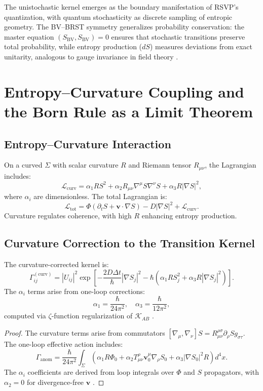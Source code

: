 \documentclass[12pt]{article}
\begin{document}
The unistochastic kernel emerges as the boundary manifestation of RSVP’s quantization, with quantum stochasticity as discrete sampling of entropic geometry. The BV–BRST symmetry generalizes probability conservation: the master equation \((S_{\mathrm{BV}}, S_{\mathrm{BV}}) = 0\) ensures that stochastic transitions preserve total probability, while entropy production (\(dS\)) measures deviations from exact unitarity, analogous to gauge invariance in field theory \citep{Alexandrov1997}.

\section{Entropy–Curvature Coupling and the Born Rule as a Limit Theorem}

\subsection{Entropy–Curvature Interaction}

On a curved \(\Sigma\) with scalar curvature \(R\) and Riemann tensor \(R_{\mu\nu}\), the Lagrangian includes:
\[
\mathcal{L}_{\text{curv}} = \alpha_1 R S^2 + \alpha_2 R_{\mu\nu} \nabla^\mu S \nabla^\nu S + \alpha_3 R |\nabla S|^2,
\]
where \(\alpha_i\) are dimensionless. The total Lagrangian is:
\[
\mathcal{L}_{\text{tot}} = \Phi (\partial_t S + \mathbf{v} \cdot \nabla S) - D |\nabla S|^2 + \mathcal{L}_{\text{curv}}.
\]
Curvature regulates coherence, with high \(R\) enhancing entropy production.

\subsection{Curvature Correction to the Transition Kernel}

The curvature-corrected kernel is:
\[
\Gamma_{ij}^{(\mathrm{curv})} = |U_{ij}|^2 \exp\left[ -\frac{2 D \Delta t}{\hbar} |\nabla S_j|^2 - \hbar \left( \alpha_1 R S_j^2 + \alpha_3 R |\nabla S_j|^2 \right) \right].
\]
The \(\alpha_i\) terms arise from one-loop corrections:
\[
\alpha_1 = \frac{\hbar}{24 \pi^2}, \quad \alpha_3 = \frac{\hbar}{12 \pi^2},
\]
computed via \(\zeta\)-function regularization of \(\mathcal{K}_{AB}\) \citep{Pantev2013}.

\begin{proof}
The curvature terms arise from commutators \([\nabla_\mu, \nabla_\nu] S = R_{\mu\nu}^{\rho\sigma} \partial_\rho S g_{\sigma\tau}\). The one-loop effective action includes:
\[
\Gamma_{\mathrm{anom}} = \frac{\hbar}{24 \pi^2} \int_\Sigma \left( \alpha_1 R \Phi_0 + \alpha_2 T_{\mu\nu}^{\rho} \mathbf{v}_0^\mu \nabla_\rho S_0 + \alpha_3 |\nabla S_0|^2 R \right) d^4x.
\]
The \(\alpha_i\) coefficients are derived from loop integrals over \(\Phi\) and \(S\) propagators, with \(\alpha_2 = 0\) for divergence-free \(\mathbf{v}\) \citep{Pantev2013}.
\end{proof}
\end{document}
